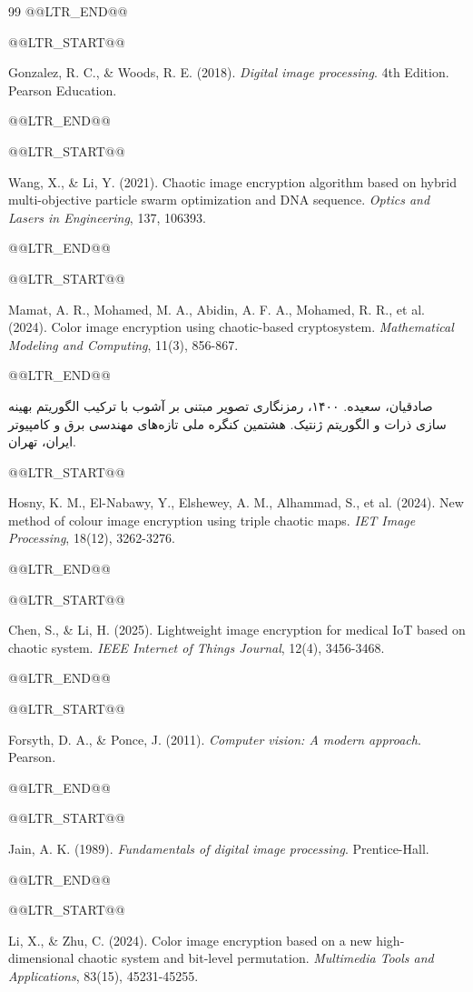 \begin{thebibliography}{99}
@@LTR_END@@

@@LTR_START@@

 Gonzalez, R. C., \& Woods, R. E. (2018). \textit{Digital image processing}. 4th Edition. Pearson Education.

@@LTR_END@@

@@LTR_START@@

 Wang, X., \& Li, Y. (2021). Chaotic image encryption algorithm based on hybrid multi-objective particle swarm optimization and DNA sequence. \textit{Optics and Lasers in Engineering}, 137, 106393.

@@LTR_END@@

@@LTR_START@@

 Mamat, A. R., Mohamed, M. A., Abidin, A. F. A., Mohamed, R. R., et al. (2024). Color image encryption using chaotic-based cryptosystem. \textit{Mathematical Modeling and Computing}, 11(3), 856-867.

@@LTR_END@@

 صادقیان، سعیده. ۱۴۰۰، رمزنگاری تصویر مبتنی بر آشوب با ترکیب الگوریتم بهینه سازی ذرات و الگوریتم ژنتیک. هشتمین کنگره ملی تازه‌های مهندسی برق و کامپیوتر ایران، تهران.

@@LTR_START@@

 Hosny, K. M., El-Nabawy, Y., Elshewey, A. M., Alhammad, S., et al. (2024). New method of colour image encryption using triple chaotic maps. \textit{IET Image Processing}, 18(12), 3262-3276.

@@LTR_END@@

@@LTR_START@@

 Chen, S., \& Li, H. (2025). Lightweight image encryption for medical IoT based on chaotic system. \textit{IEEE Internet of Things Journal}, 12(4), 3456-3468.

@@LTR_END@@

@@LTR_START@@

 Forsyth, D. A., \& Ponce, J. (2011). \textit{Computer vision: A modern approach}. Pearson.

@@LTR_END@@

@@LTR_START@@

 Jain, A. K. (1989). \textit{Fundamentals of digital image processing}. Prentice-Hall.

@@LTR_END@@

@@LTR_START@@

 Li, X., \& Zhu, C. (2024). Color image encryption based on a new high-dimensional chaotic system and bit-level permutation. \textit{Multimedia Tools and Applications}, 83(15), 45231-45255.


\end{thebibliography}
